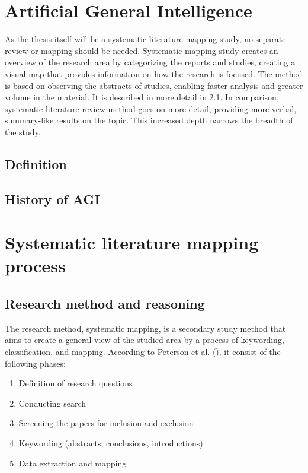 \documentclass[utf8,english]{gradu3}
\begin{document}
\chapter{Artificial General Intelligence} 
As the thesis itself will be a systematic literature mapping study, no separate review or mapping should be needed. Systematic mapping study creates an overview of the research area by categorizing the reports and studies, creating a visual map that provides information on how the research is focused. The method is based on observing the abstracts of studies, enabling faster analysis and greater volume in the material. It is described in more detail in \ref{method}. In comparison, systematic literature review method goes on more detail, providing more verbal, summary-like results on the topic. This increased depth narrows the breadth of the study. 

\section{Definition}
\section{History of AGI}


\chapter{Systematic literature mapping process}

\section{Research method and reasoning}

\label{method}
The research method, systematic mapping, is a secondary study method that aims to create a general view of the studied area by a process of keywording, classification, and mapping. According to Peterson et al. (\cite*{petersen2008}), it consist of the following phases:
\begin{enumerate}
    \item Definition of research questions
    \item Conducting search
    \item Screening the papers for inclusion and exclusion
    \item Keywording (abstracts, conclusions, introductions)
    \item Data extraction and mapping
\end{enumerate}
\end{document}
